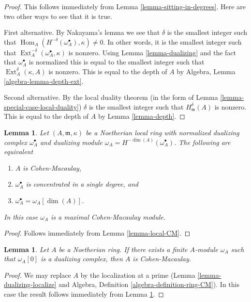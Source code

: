 \documentclass{stacks-project}
\theoremstyle{plain}
\newtheorem{lemma}[subsection]{Lemma}
\theoremstyle{definition}
\theoremstyle{remark}
\numberwithin{equation}{subsection}
\def\Hom{\mathop{\mathrm{Hom}}\nolimits}
\def\Ext{\mathop{\mathrm{Ext}}\nolimits}
\begin{document}
\begin{proof}
This follows immediately from
Lemma \ref{lemma-sitting-in-degrees}.
Here are two other ways to see that it is true.

\medskip\noindent
First alternative. By Nakayama's lemma we see that
$\delta$ is the smallest integer such that
$\Hom_A(H^{-\delta}(\omega_A^\bullet), \kappa) \not = 0$.
In other words, it is the smallest integer such that
$\Ext_A^{-\delta}(\omega_A^\bullet, \kappa)$
is nonzero. Using Lemma \ref{lemma-dualizing} and the fact that
$\omega_A^\bullet$ is normalized this is equal to the
smallest integer such that $\Ext_A^\delta(\kappa, A)$ is
nonzero. This is equal to the depth of $A$ by
Algebra, Lemma \ref{algebra-lemma-depth-ext}.

\medskip\noindent
Second alternative. By the local duality theorem
(in the form of Lemma \ref{lemma-special-case-local-duality})
$\delta$ is the smallest integer such that $H^\delta_\mathfrak m(A)$
is nonzero. This is equal to the depth of $A$ by
Lemma \ref{lemma-depth}.
\end{proof}

\begin{lemma}
\label{lemma-apply-CM}
Let $(A, \mathfrak m, \kappa)$ be a Noetherian local ring
with normalized dualizing complex $\omega_A^\bullet$
and dualizing module $\omega_A = H^{-\dim(A)}(\omega_A^\bullet)$.
The following are equivalent
\begin{enumerate}
\item $A$ is Cohen-Macaulay,
\item $\omega_A^\bullet$ is concentrated in a single degree, and
\item $\omega_A^\bullet = \omega_A[\dim(A)]$.
\end{enumerate}
In this case $\omega_A$ is a maximal Cohen-Macaulay module.
\end{lemma}

\begin{proof}
Follows immediately from Lemma \ref{lemma-local-CM}.
\end{proof}

\begin{lemma}
\label{lemma-has-dualizing-module-CM}
Let $A$ be a Noetherian ring. If there exists a finite $A$-module
$\omega_A$ such that $\omega_A[0]$ is a dualizing complex, then
$A$ is Cohen-Macaulay.
\end{lemma}

\begin{proof}
We may replace $A$ by the localization at a prime
(Lemma \ref{lemma-dualizing-localize} and
Algebra, Definition \ref{algebra-definition-ring-CM}).
In this case the result follows immediately from
Lemma \ref{lemma-apply-CM}.
\end{proof}
\end{document}
